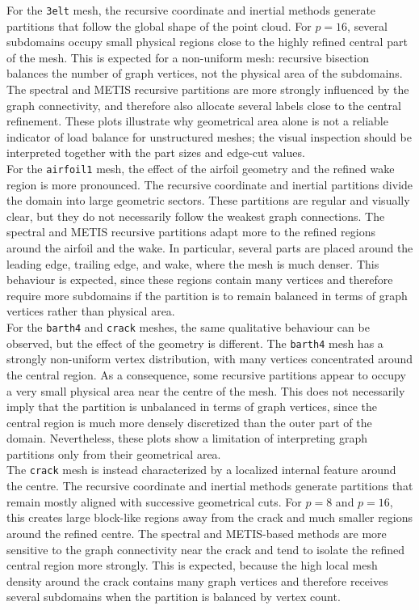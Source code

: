 \documentclass[unicode,10pt,a4paper,oneside,numbers=endperiod,openany]{scrartcl}
\begin{document}
For the \texttt{3elt} mesh, the recursive coordinate and inertial methods generate partitions that
follow the global shape of the point cloud. For \(p=16\), several subdomains occupy small physical
regions close to the highly refined central part of the mesh. This is expected for a non-uniform mesh:
recursive bisection balances the number of graph vertices, not the physical area of the subdomains.
The spectral and METIS recursive partitions are more strongly influenced by the graph connectivity,
and therefore also allocate several labels close to the central refinement. These plots illustrate why
geometrical area alone is not a reliable indicator of load balance for unstructured meshes; the visual
inspection should be interpreted together with the part sizes and edge-cut values.\\

For the \texttt{airfoil1} mesh, the effect of the airfoil geometry and the refined wake region is more
pronounced. The recursive coordinate and inertial partitions divide the domain into large geometric
sectors. These partitions are regular and visually clear, but they do not necessarily follow the
weakest graph connections. The spectral and METIS recursive partitions adapt more to the refined
regions around the airfoil and the wake. In particular, several parts are placed around the leading
edge, trailing edge, and wake, where the mesh is much denser. This behaviour is expected, since
these regions contain many vertices and therefore require more subdomains if the partition is to
remain balanced in terms of graph vertices rather than physical area.\\

For the \texttt{barth4} and \texttt{crack} meshes, the same qualitative behaviour can be observed,
but the effect of the geometry is different. The \texttt{barth4} mesh has a strongly non-uniform
vertex distribution, with many vertices concentrated around the central region. As a consequence,
some recursive partitions appear to occupy a very small physical area near the centre of the mesh.
This does not necessarily imply that the partition is unbalanced in terms of graph vertices, since
the central region is much more densely discretized than the outer part of the domain. Nevertheless,
these plots show a limitation of interpreting graph partitions only from their geometrical area.\\

The \texttt{crack} mesh is instead characterized by a localized internal feature around the centre.
The recursive coordinate and inertial methods generate partitions that remain mostly aligned with
successive geometrical cuts. For \(p=8\) and \(p=16\), this creates large block-like regions away
from the crack and much smaller regions around the refined centre. The spectral and METIS-based
methods are more sensitive to the graph connectivity near the crack and tend to isolate the refined
central region more strongly. This is expected, because the high local mesh density around the crack
contains many graph vertices and therefore receives several subdomains when the partition is balanced
by vertex count.\\
\end{document}
